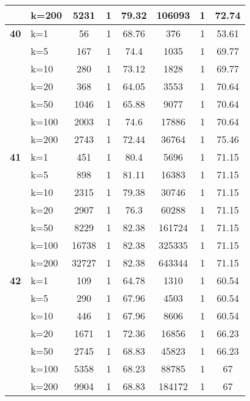\begin{table}[htbp]
\begin{tabular}{ll|ccc|ccc}
     & k=200 & 5231 & 1 & 79.32 & 106093 & 1 & 72.74 \\ \hline
    \multicolumn{1}{r}{\textbf{40}} & k=1 & 56 & 1 & 68.76 & 376 & 1 & 53.61 \\ 
     & k=5 & 167 & 1 & 74.4 & 1035 & 1 & 69.77 \\ 
     & k=10 & 280 & 1 & 73.12 & 1828 & 1 & 69.77 \\ 
     & k=20 & 368 & 1 & 64.05 & 3553 & 1 & 70.64 \\ 
     & k=50 & 1046 & 1 & 65.88 & 9077 & 1 & 70.64 \\ 
     & k=100 & 2003 & 1 & 74.6 & 17886 & 1 & 70.64 \\ 
     & k=200 & 2743 & 1 & 72.44 & 36764 & 1 & 75.46 \\ \hline
    \multicolumn{1}{r}{\textbf{41}} & k=1 & 451 & 1 & 80.4 & 5696 & 1 & 71.15 \\ 
     & k=5 & 898 & 1 & 81.11 & 16383 & 1 & 71.15 \\ 
     & k=10 & 2315 & 1 & 79.38 & 30746 & 1 & 71.15 \\ 
     & k=20 & 2907 & 1 & 76.3 & 60288 & 1 & 71.15 \\ 
     & k=50 & 8229 & 1 & 82.38 & 161724 & 1 & 71.15 \\ 
     & k=100 & 16738 & 1 & 82.38 & 325335 & 1 & 71.15 \\ 
     & k=200 & 32727 & 1 & 82.38 & 643344 & 1 & 71.15 \\ \hline
    \multicolumn{1}{r}{\textbf{42}} & k=1 & 109 & 1 & 64.78 & 1310 & 1 & 60.54 \\ 
     & k=5 & 290 & 1 & 67.96 & 4503 & 1 & 60.54 \\ 
     & k=10 & 446 & 1 & 67.96 & 8606 & 1 & 60.54 \\ 
     & k=20 & 1671 & 1 & 72.36 & 16856 & 1 & 66.23 \\ 
     & k=50 & 2745 & 1 & 68.83 & 45823 & 1 & 66.23 \\ 
     & k=100 & 5358 & 1 & 68.23 & 88785 & 1 & 67 \\ 
     & k=200 & 9904 & 1 & 68.83 & 184172 & 1 & 67 \\ \hline
    \end{tabular}
    \label{use_case_7}
    \end{table}
    